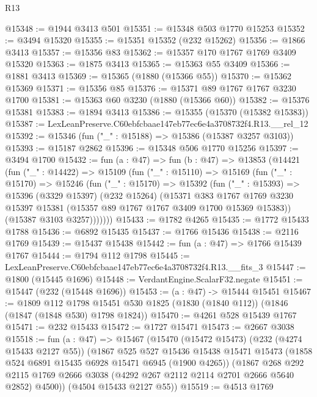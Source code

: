 \begin{lexlean}{R13}
\begin{coremodule}
@15348 := @1944 @3413 @501
@15351 := @15348 @503 @1770 @15253
@15352 := @3494 @15320
@15355 := @15351 @15352 (@232 @15262)
@15356 := @1866 @3413
@15357 := @15356 @83
@15362 := @15357 @170 @1767 @1769 @3409 @15320
@15363 := @1875 @3413
@15365 := @15363 @55 @3409
@15366 := @1881 @3413
@15369 := @15365 (@1880 (@15366 @55))
@15370 := @15362 @15369
@15371 := @15356 @85
@15376 := @15371 @89 @1767 @1767 @3230 @1700
@15381 := @15363 @60 @3230 (@1880 (@15366 @60))
@15382 := @15376 @15381
@15383 := @1894 @3413
@15386 := @15355 (@15370 (@15382 @15383))
@15387 := LexLeanPreserve.C60ebfcbaae147eb77ec6e4a3708732f4.R13.__rel_12
@15392 := @15346 (fun ("_" : @15188) => @15386 (@15387 @3257 @3103))
@15393 := @15187 @2862
@15396 := @15348 @506 @1770 @15256
@15397 := @3494 @1700
@15432 := fun (a : @47) =>
  fun (b : @47) =>
  @13853
    (@14421
      (fun ("_" : @14422) =>
      @15109
        (fun ("_" : @15110) =>
        @15169
          (fun ("_" : @15170) =>
          @15246
            (fun ("_" : @15170) =>
            @15392
              (fun ("_" : @15393) =>
              @15396
                (@3329 @15397)
                (@232 @15264)
                (@15371
                  @383
                  @1767
                  @1769
                  @3230
                  @15397
                  @15381
                  (@15357 @89 @1767 @1767 @3409 @1700 @15369 @15383))
                (@15387 @3103 @3257)))))))
@15433 := @1782 @4265
@15435 := @1772 @15433 @1788
@15436 := @6892 @15435
@15437 := @1766 @15436
@15438 := @2116 @1769
@15439 := @15437 @15438
@15442 := fun (a : @47) => @1766 @15439 @1767
@15444 := @1794 @112 @1798
@15445 := LexLeanPreserve.C60ebfcbaae147eb77ec6e4a3708732f4.R13.__fits_3
@15447 := @1800 (@15445 @1696)
@15448 := VerdantEngine.ScalarF32.negate
@15451 := @15447 (@232 (@15448 @1696))
@15453 := (a : @47) -> @15444 @15451
@15467 := @1809
    @112
    @1798
    @15451
    @530
    @1825
    (@1830 (@1840 @112))
    (@1846 (@1847 (@1848 @530) @1798 @1824))
@15470 := @4261 @528 @15439 @1767
@15471 := @232 @15433
@15472 := @1727 @15471
@15473 := @2667 @3038
@15518 := fun (a : @47) =>
  @15467
    (@15470
      (@15472 @15473)
      (@232 (@4274 @15433 @2127 @55))
      (@1867
        @525
        @527
        @15436
        @15438
        @15471
        @15473
        (@1858 @524 @6891 @15435 @6928 @15471 @6945 (@1900 @4265))
        (@1867
          @268
          @292
          @2115
          @1769
          @2666
          @3038
          (@4292 @267 @2112 @2114 @2701 @2666 @5640 @2852)
          @4500))
      (@4504 @15433 @2127 @55))
@15519 := @4513 @1769

\end{coremodule}
\end{lexlean}
